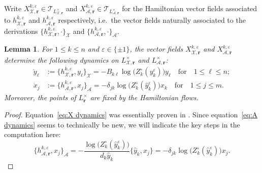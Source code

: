 \documentclass{amsart}
\newtheorem{lemma}[theorem]{Lemma}
\numberwithin{equation}{section}
\newcommand{\bfr}{{\boldsymbol{r}}}
\newcommand{\cA}{\mathcal{A}}
\newcommand{\cT}{\mathcal{T}}
\newcommand{\cX}{\mathcal{X}}
\begin{document}
Write $X_{\cX,\bfr}^{k,\varepsilon}\in\cT_{L^\times_{\cX,\bfr}}$ and $X_{\cA,\bfr}^{k,\varepsilon}\in\cT_{L^\times_{\cA,\bfr}}$ for the Hamiltonian vector fields associated to $h_{\cX,\bfr}^{k,\varepsilon}$ and $h_{\cA,\bfr}^{k,\varepsilon}$ respectively, i.e.\ the vector fields naturally associated to the derivations $\{h_{\cX,\bfr}^{k,\varepsilon},\cdot\}_\cX$ and $\{h_{\cA,\bfr}^{k,\varepsilon},\cdot\}_\cA$.
\begin{lemma}
  \label{le:hamiltonian dynamics}
  For $1\le k\le n$ and $\varepsilon\in\{\pm1\}$, the vector fields $X_{\cX,\bfr}^{k,\varepsilon}$ and $X_{\cA,\bfr}^{k,\varepsilon}$ determine the following dynamics on $L^\times_{\cX,\bfr}$ and $L^\times_{\cA,\bfr}$:
  \begin{align}
    \label{eq:X dynamics}
    \dot y_\ell&:=\{h_{\cX,\bfr}^{k,\varepsilon},y_\ell\}_\cX=-B_{k\ell}\log\big(Z_k^\circ(y_k^\varepsilon)\big)y_\ell\quad\text{for}\quad 1\le\ell\le n;\\
    \label{eq:A dynamics}
    \dot x_j&:=\{h_{\cA,\bfr}^{k,\varepsilon},x_j\}_\cA=-\delta_{jk}\log\big(Z_k^\circ(\hat y_k^\varepsilon)\big)x_k\quad\text{for}\quad 1\le j\le m.
  \end{align}
  Moreover, the points of $L^\times_\bfr$ are fixed by the Hamiltonian flows.
\end{lemma}
\begin{proof}
  Equation~\eqref{eq:X dynamics} was essentially proven in \cite{GNR17}.
  Since equation~\eqref{eq:A dynamics} seems to technically be new, we will indicate the key steps in the computation here:
  \[\{h_{\cA,\bfr}^{k,\varepsilon},x_j\}_\cA=-\frac{\log\big(Z_k^\circ(\hat y_k^\varepsilon)\big)}{d_k\hat y_k}\{\hat y_k,x_j\}=-\delta_{jk}\log\big(Z_k^\circ(\hat y_k^\varepsilon)\big)x_j.\]
\end{proof}
\end{document}

